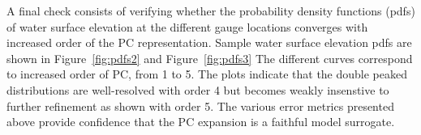  
A final check consists of verifying whether the probability density
functions (pdfs) of water surface elevation at the different gauge locations
converges with increased order of the PC representation.  Sample
water surface elevation pdfs are shown in Figure~\ref{fig:pdfs2}
and Figure~\ref{fig:pdfs3}
The different curves
correspond to increased order of PC, from 1 to 5.
The plots indicate that the double peaked distributions are
well-resolved with order  4 but becomes weakly insenstive to further refinement 
as shown with order 5. The various error metrics presented above 
provide confidence that the PC expansion is a faithful 
model surrogate. 

